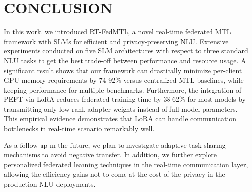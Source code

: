 \section{CONCLUSION}
\label{sec:conclusion}
In this work, we introduced RT-FedMTL, a novel real-time federated MTL framework with SLMs for efficient and privacy-preserving NLU. 
Extensive experiments conducted on five SLM architectures with respect to three standard NLU tasks to get the best trade-off between performance and resource usage. A significant result shows that our framework can drastically minimize per-client GPU memory requirements by 74-92\% versus centralized MTL baselines, while keeping performance for multiple benchmarks. Furthermore, the integration of PEFT via LoRA reduces federated training time by 38-62\% for most models by transmitting only low-rank adapter weights instead of full model parameters. This empirical evidence demonstrates that LoRA can handle communication bottlenecks in real-time scenario remarkably well.

As a follow-up in the future, we plan to investigate adaptive task-sharing mechanisms to avoid negative transfer. In addition, we further explore personalized federated learning techniques in the real-time communication layer, allowing the efficiency gains not to come at the cost of the privacy in the production NLU deployments.
